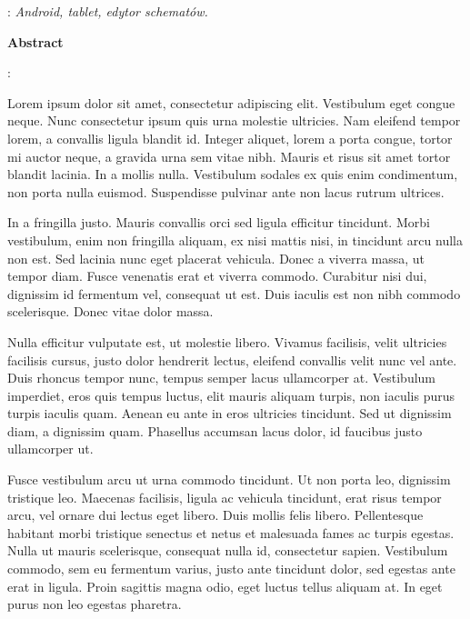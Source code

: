     : {\itshape Android, tablet, edytor schematów.}
    \par 
   \cleardoublepage
    \begin{center}{\large\bfseries Abstract}\par\bigskip\end{center}
    : \tytulen
    \par
    \vspace*{1\baselineskip}
    {
    Lorem ipsum dolor sit amet, consectetur adipiscing elit. Vestibulum eget congue neque. Nunc consectetur ipsum quis urna molestie ultricies. Nam eleifend tempor lorem, a convallis ligula blandit id. Integer aliquet, lorem a porta congue, tortor mi auctor neque, a gravida urna sem vitae nibh. Mauris et risus sit amet tortor blandit lacinia. In a mollis nulla. Vestibulum sodales ex quis enim condimentum, non porta nulla euismod. Suspendisse pulvinar ante non lacus rutrum ultrices.

	In a fringilla justo. Mauris convallis orci sed ligula efficitur tincidunt. Morbi vestibulum, enim non fringilla aliquam, ex nisi mattis nisi, in tincidunt arcu nulla non est. Sed lacinia nunc eget placerat vehicula. Donec a viverra massa, ut tempor diam. Fusce venenatis erat et viverra commodo. Curabitur nisi dui, dignissim id fermentum vel, consequat ut est. Duis iaculis est non nibh commodo scelerisque. Donec vitae dolor massa.

	Nulla efficitur vulputate est, ut molestie libero. Vivamus facilisis, velit ultricies facilisis cursus, justo dolor hendrerit lectus, eleifend convallis velit nunc vel ante. Duis rhoncus tempor nunc, tempus semper lacus ullamcorper at. Vestibulum imperdiet, eros quis tempus luctus, elit mauris aliquam turpis, non iaculis purus turpis iaculis quam. Aenean eu ante in eros ultricies tincidunt. Sed ut dignissim diam, a dignissim quam. Phasellus accumsan lacus dolor, id faucibus justo ullamcorper ut.

	Fusce vestibulum arcu ut urna commodo tincidunt. Ut non porta leo, dignissim tristique leo. Maecenas facilisis, ligula ac vehicula tincidunt, erat risus tempor arcu, vel ornare dui lectus eget libero. Duis mollis felis libero. Pellentesque habitant morbi tristique senectus et netus et malesuada fames ac turpis egestas. Nulla ut mauris scelerisque, consequat nulla id, consectetur sapien. Vestibulum commodo, sem eu fermentum varius, justo ante tincidunt dolor, sed egestas ante erat in ligula. Proin sagittis magna odio, eget luctus tellus aliquam at. In eget purus non leo egestas pharetra.

}
